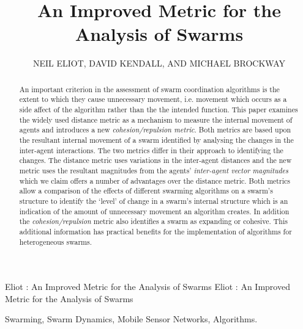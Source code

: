 \documentclass{ieeeaccess}
\begin{document}

\title{An Improved Metric for the Analysis of Swarms}
\author{\uppercase{Neil Eliot},
\uppercase{David Kendall, and Michael Brockway}}
\address[1]{Northumbria University, Department of Computing and Information Sciences, Newcastle upon Tyne, NE1 8ST}

\markboth
{Eliot \headeretal: An Improved Metric for the Analysis of Swarms}
{Eliot \headeretal: An Improved Metric for the Analysis of Swarms}



\begin{abstract}
An important criterion in the assessment of swarm coordination algorithms is
the extent to which they cause unnecessary movement, i.e. movement which
occurs as a side affect of the algorithm rather than the the intended
function. This paper examines the widely used distance metric as a mechanism
to measure the internal movement of agents and introduces a new
\emph{cohesion/repulsion metric}.  Both metrics are based upon the resultant
internal movement of a swarm identified by analysing the changes in the
inter-agent interactions. The two metrics differ in their approach to
identifying the changes. The distance metric uses variations in the
inter-agent distances and the new metric uses the resultant magnitudes from
the agents' \emph{inter-agent vector magnitudes}  which we claim offers a
number of advantages over the distance metric.  Both metrics allow a
comparison of the effects of different swarming algorithms on a swarm's
structure to identify the `level' of change in a swarm's internal structure
which is an indication of the amount of unnecessary movement an algorithm
creates.  In addition the \emph{cohesion/repulsion} metric also identifies a
swarm as expanding or cohesive.  This additional information has practical
benefits for the implementation of algorithms for heterogeneous swarms.
\end{abstract}

\begin{keywords}
Swarming, Swarm Dynamics, Mobile Sensor Networks, Algorithms.
\end{keywords}


\titlepgskip=-15pt
\maketitle
\end{document}
